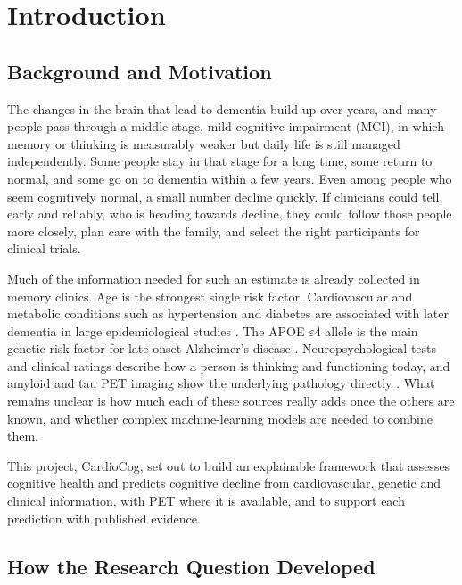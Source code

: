 \chapter{Introduction}
\label{ch:intro}

\section{Background and Motivation}

The changes in the brain that lead to dementia build up over years, and many people pass through a middle stage, mild cognitive impairment (MCI), in which memory or thinking is measurably weaker but daily life is still managed independently. Some people stay in that stage for a long time, some return to normal, and some go on to dementia within a few years. Even among people who seem cognitively normal, a small number decline quickly. If clinicians could tell, early and reliably, who is heading towards decline, they could follow those people more closely, plan care with the family, and select the right participants for clinical trials.

Much of the information needed for such an estimate is already collected in memory clinics. Age is the strongest single risk factor. Cardiovascular and metabolic conditions such as hypertension and diabetes are associated with later dementia in large epidemiological studies \cite{livingston2020,sierra2020,hainsworth2024,cao2024}. The APOE $\varepsilon$4 allele is the main genetic risk factor for late-onset Alzheimer's disease \cite{wolfe2018}. Neuropsychological tests and clinical ratings describe how a person is thinking and functioning today, and amyloid and tau PET imaging show the underlying pathology directly \cite{chandra2019,leuzy2019}. What remains unclear is how much each of these sources really adds once the others are known, and whether complex machine-learning models are needed to combine them.

This project, CardioCog, set out to build an explainable framework that assesses cognitive health and predicts cognitive decline from cardiovascular, genetic and clinical information, with PET where it is available, and to support each prediction with published evidence.

\section{How the Research Question Developed}

